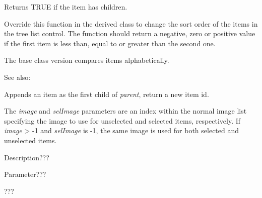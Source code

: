 \label{wxtreelistctrlitemhaschildren}


Returns TRUE if the item has children.

\label{wxtreelistctrloncompareitems}


Override this function in the derived class to change the sort order of the
items in the tree list control. The function should return a negative, zero or
positive value if the first item is less than, equal to or greater than the
second one.

The base class version compares items alphabetically.

See also: 

\label{wxtreelistctrlprependitem}


Appends an item as the first child of {\it parent}, return a new item id.

The {\it image} and {\it selImage} parameters are an index within
the normal image list specifying the image to use for unselected and
selected items, respectively.
If {\it image} > -1 and {\it selImage} is -1, the same image is used for
both selected and unselected items.

\label{wxtreelistctrlrefresh}


Description???

Parameter???

\label{wxtreelistctrlsetbackgroundcolour}


???

\label{wxtreelistctrlsetfocus}


